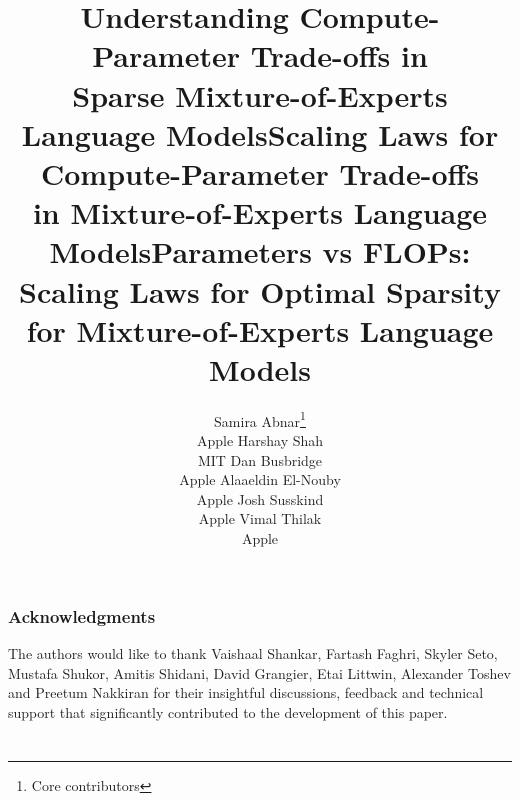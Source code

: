 \documentclass{article} %
\title{Understanding Compute-Parameter Trade-offs in \\ Sparse Mixture-of-Experts Language Models}
\title{Scaling Laws for Compute-Parameter Trade-offs \\ in  Mixture-of-Experts Language Models}
\title{Parameters vs FLOPs: Scaling Laws for Optimal Sparsity for Mixture-of-Experts Language Models}
\author{
\hspace{5pt} 
Samira Abnar\thanks{Core contributors} \\
Apple
\And Harshay Shah\footnotemark[1] \\
MIT %
\And Dan Busbridge \\
Apple
\hspace{5pt}
\And Alaaeldin El-Nouby \\
Apple
\And Josh Susskind \\
Apple 
\And
Vimal Thilak\footnotemark[1] \\
Apple 
\vspace{-40pt}
}
\date{}
\begin{document}
\setcounter{tocdepth}{2}
\doparttoc %
\renewcommand\ptctitle{}
\faketableofcontents %

\maketitle



% 









\section*{Acknowledgments}

The authors would like to thank Vaishaal Shankar, Fartash Faghri, Skyler Seto, Mustafa Shukor, Amitis Shidani, David Grangier, Etai Littwin, Alexander Toshev and Preetum Nakkiran for their insightful discussions, feedback and technical support that significantly contributed to the development of this paper.

 
% 
% 
% 

\newpage




\clearpage
\appendix
{} %
\renewcommand\ptctitle{Appendices}
\part{}
\parttoc
\clearpage

\end{document}

